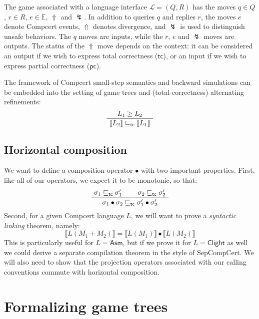 \documentclass[11pt]{article}
\newcommand{\kw}[1]{{\mathsf{#1}}}
\begin{document}
The game associated with a language interface $\mathcal{L} = (Q, R)$
has the moves
$q \in Q$, $r \in R$, $e \in \mathbb{E}$, $\Uparrow$ and $\lightning$.
In addition to queries $q$ and replies $r$,
the moves $e$ denote Compcert events,
$\Uparrow$ denotes divergence,
and $\lightning$ is used to distinguish unsafe behaviors.
The $q$ moves are inputs,
while the $r$, $e$ and $\lightning$ moves are outputs.
The status of the $\Uparrow$ move depends on the context:
it can be considered
an output if we wish to express total correctness ($\kw{tc}$), or
an input if we wish to express partial correctness ($\kw{pc}$).

The framework of
Compcert small-step semantics and backward simulations
can be embedded into
the setting of game trees and (total-correctness) alternating refinements:
\begin{equation}
  \AxiomC{$L_1 \ge L_2$}
  \UnaryInfC{$\llbracket L_2 \rrbracket \sqsubseteq_\kw{tc} \llbracket L_1 \rrbracket$}
  \DisplayProof
  \label{eqn:hcompm}
\end{equation}

\subsection{Horizontal composition}

We want to define a composition operator $\bullet$
with two important properties.
First, like all of our operators,
we expect it to be monotonic, so that:
\begin{equation}
  \AxiomC{$\sigma_1 \sqsubseteq_\kw{tc} \sigma_1'$}
  \AxiomC{$\sigma_2 \sqsubseteq_\kw{tc} \sigma_2'$}
  \BinaryInfC{$\sigma_1 \bullet \sigma_2 \sqsubseteq_\kw{tc}
                \sigma_1' \bullet \sigma_2'$}
  \DisplayProof
  \label{eqn:embed}
\end{equation}
Second,
for a given Compcert language $L$,
we will want to prove a \emph{syntactic linking} theorem,
namely:
\begin{equation}
  \llbracket L(M_1 + M_2) \rrbracket =
  \llbracket L(M_1) \rrbracket \bullet
  \llbracket L(M_2) \rrbracket
  \label{eqn:slink}
\end{equation}
This is particularly useful for $L = \kw{Asm}$,
but if we prove it for $L = \kw{Clight}$ as well
we could derive a separate compilation theorem
in the style of SepCompCert.
We will also need to show that the projection operators
associated with our calling conventions
commute with horizontal composition.

\section{Formalizing game trees}
\end{document}
